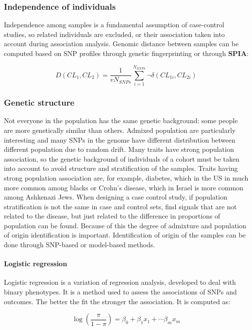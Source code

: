 		\subsubsection{Independence of individuals}
		Independence among samples is a fundamental assumption of case-control studies, so related individuals are excluded, or their association taken into account during association analysis.
		Genomic distance between samples can be computed based on SNP profiles through genetic fingerprinting or through \textbf{SPIA}:

		$$D(CL_1, CL_2) = \frac{1}{vN_{SNPs}} \sum\limits_{i=1}^{N_{SNPs}} \neg\delta(CL_{1i}, CL_{2i})$$

		\subsubsection{Genetic structure}
		Not everyone in the population has the same genetic background: some people are more genetically similar than others.
		Admixed population are particularly interesting and many SNPs in the genome have different distribution between different population due to random drift.
		Many traits have strong population association, so the genetic background of individuals of a cohort must be taken into account to avoid structure and stratification of the samples.
		Traits having strong population association are, for example, diabetes, which in the US in much more common among blacks or Crohn's disease, which in Israel is more common among Ashkenazi Jews.
		When designing a case control study, if population stratification is not the same in case and control sets, find signals that are not related to the disease, but just related to the difference in proportions of population can be found.
		Because of this the degree of admixture and population of origin identification is important.
		Identification of origin of the samples can be done through SNP-based or model-based methods.

			\paragraph{Logistic regression}
			Logistic regression is a variation of regression analysis, developed to deal with binary phenotypes.
			It is a method used to assess the associations of SNPs and outcomes.
			The better the fit the stronger the association.
			It is computed as:

			$$\log(\frac{\pi}{1-\pi}) = \beta_0+\beta_1x_1+\cdots \beta_mx_m$$


